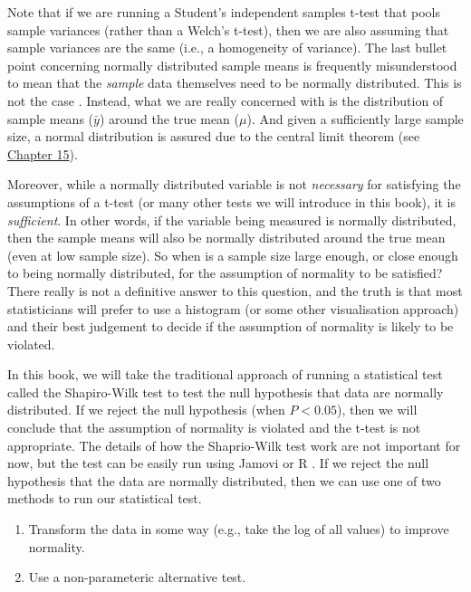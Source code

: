 \documentclass[
]{scrbook}
\providecommand{\tightlist}{%
  \setlength{\itemsep}{0pt}\setlength{\parskip}{0pt}}
\begin{document}
Note that if we are running a Student's independent samples t-test that pools sample variances (rather than a Welch's t-test), then we are also assuming that sample variances are the same (i.e., a homogeneity of variance).
The last bullet point concerning normally distributed sample means is frequently misunderstood to mean that the \emph{sample} data themselves need to be normally distributed.
This is not the case \citep{Johnson1995, Lumley2002}.
Instead, what we are really concerned with is the distribution of sample means (\(\bar{y}\)) around the true mean (\(\mu\)).
And given a sufficiently large sample size, a normal distribution is assured due to the central limit theorem (see \protect\hyperlink{Chapter_15}{Chapter 15}).

Moreover, while a normally distributed variable is not \emph{necessary} for satisfying the assumptions of a t-test (or many other tests we will introduce in this book), it is \emph{sufficient}.
In other words, if the variable being measured is normally distributed, then the sample means will also be normally distributed around the true mean (even at low sample size).
So when is a sample size large enough, or close enough to being normally distributed, for the assumption of normality to be satisfied?
There really is not a definitive answer to this question, and the truth is that most statisticians will prefer to use a histogram (or some other visualisation approach) and their best judgement to decide if the assumption of normality is likely to be violated.

In this book, we will take the traditional approach of running a statistical test called the Shapiro-Wilk test to test the null hypothesis that data are normally distributed.
If we reject the null hypothesis (when \(P < 0.05\)), then we will conclude that the assumption of normality is violated and the t-test is not appropriate.
The details of how the Shaprio-Wilk test work are not important for now, but the test can be easily run using Jamovi or R \citep{Jamovi2022, Rproject}.
If we reject the null hypothesis that the data are normally distributed, then we can use one of two methods to run our statistical test.

\begin{enumerate}
\def\labelenumi{\arabic{enumi}.}
\tightlist
\item
  Transform the data in some way (e.g., take the log of all values) to improve normality.
\item
  Use a non-parameteric alternative test.
\end{enumerate}
\end{document}
